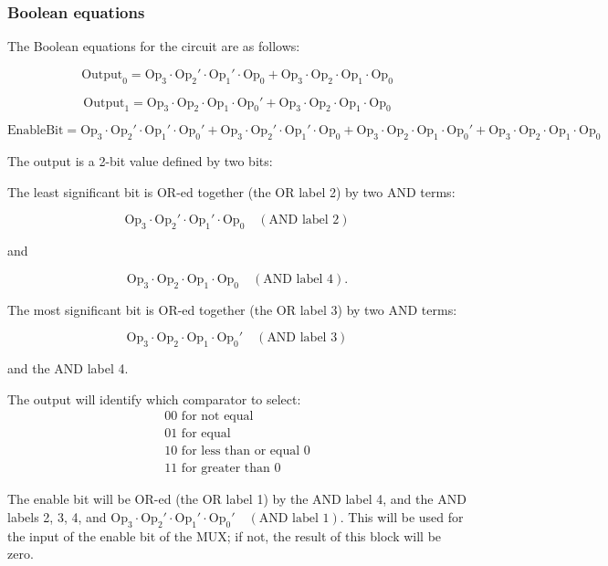 \documentclass{article}
\begin{document}
\subsubsection{Boolean equations}
The Boolean equations for the circuit are as follows:

\[
\text{Output}_0 = \text{Op}_3 \cdot \text{Op}_2' \cdot \text{Op}_1' \cdot \text{Op}_0 + \text{Op}_3 \cdot \text{Op}_2 \cdot \text{Op}_1 \cdot \text{Op}_0
\]

\[
\text{Output}_1 = \text{Op}_3 \cdot \text{Op}_2 \cdot \text{Op}_1 \cdot \text{Op}_0' + \text{Op}_3 \cdot \text{Op}_2 \cdot \text{Op}_1 \cdot \text{Op}_0
\]

\[
\text{EnableBit} = \text{Op}_3 \cdot \text{Op}_2' \cdot \text{Op}_1' \cdot \text{Op}_0' + \text{Op}_3 \cdot \text{Op}_2' \cdot \text{Op}_1' \cdot \text{Op}_0 + \text{Op}_3 \cdot \text{Op}_2 \cdot \text{Op}_1 \cdot \text{Op}_0' + \text{Op}_3 \cdot \text{Op}_2 \cdot \text{Op}_1 \cdot \text{Op}_0
\]

The output is a 2-bit value defined by two bits:

The least significant bit is OR-ed together (the OR label 2) by two AND terms: 

\[
\text{Op}_3 \cdot \text{Op}_2' \cdot \text{Op}_1' \cdot \text{Op}_0 \quad (\text{AND label 2})
\]

and 

\[
\text{Op}_3 \cdot \text{Op}_2 \cdot \text{Op}_1 \cdot \text{Op}_0 \quad (\text{AND label 4}).
\]

The most significant bit is OR-ed together (the OR label 3) by two AND terms: 

\[
\text{Op}_3 \cdot \text{Op}_2 \cdot \text{Op}_1 \cdot \text{Op}_0' \quad (\text{AND label 3})
\]

and the AND label 4.

The output will identify which comparator to select:
\[
\begin{array}{l}
00 \text{ for not equal} \\
01 \text{ for equal} \\
10 \text{ for less than or equal 0} \\
11 \text{ for greater than 0}
\end{array}
\]

The enable bit will be OR-ed (the OR label 1) by the AND label 4, and the AND labels 2, 3, 4, and \(\text{Op}_3 \cdot \text{Op}_2' \cdot \text{Op}_1' \cdot \text{Op}_0' \quad (\text{AND label 1})\). This will be used for the input of the enable bit of the MUX; if not, the result of this block will be zero.
\end{document}
